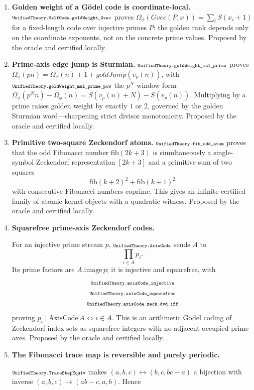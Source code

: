 \documentclass[11pt]{article}
\newcommand{\lean}[1]{\relax\ifmmode\hbox{\scriptsize\ttfamily\detokenize{#1}}\else{\small\texttt{\detokenize{#1}}}\fi}
\begin{document}
\begin{enumerate}[label=(O\arabic*)]
  \item \textbf{Golden weight of a G\"odel code is coordinate-local.}  $\lean{UnifiedTheory.SelfCode.goldWeight_Gvec}$ proves $\Omega_\phi(Gvec(P,x))=\sum_i S(x_i+1)$ for a fixed-length code over injective primes $P$: the golden rank depends only on the coordinate exponents, not on the concrete prime values.  Proposed by the oracle and certified locally.
  \item \textbf{Prime-axis edge jump is Sturmian.}  $\lean{UnifiedTheory.goldWeight_mul_prime}$ proves $\Omega_\phi(pn)=\Omega_\phi(n)+1+goldJump(v_p(n))$, with $\lean{UnifiedTheory.goldWeight_mul_prime_pow}$ the $p^N$ window form $\Omega_\phi(p^Nn)-\Omega_\phi(n)=S(v_p(n)+N)-S(v_p(n))$.  Multiplying by a prime raises golden weight by exactly $1$ or $2$, governed by the golden Sturmian word---sharpening strict divisor monotonicity.  Proposed by the oracle and certified locally.
  \item \textbf{Primitive two-square Zeckendorf atoms.}  $\lean{UnifiedTheory.fib_odd_atom}$ proves that the odd Fibonacci number $\mathrm{fib}(2k{+}3)$ is simultaneously a single-symbol Zeckendorf representation $[2k{+}3]$ and a primitive sum of two squares
  $$
    \mathrm{fib}(k{+}2)^2+\mathrm{fib}(k{+}1)^2
  $$
  with consecutive Fibonacci numbers coprime.  This gives an infinite certified family of atomic kernel objects with a quadratic witness.  Proposed by the oracle and certified locally.
  \item \textbf{Squarefree prime-axis Zeckendorf codes.}\par
  For an injective prime stream $p$, $\lean{UnifiedTheory.AxisCode}$ sends $A$ to
  $$
    \prod_{i\in A}p_i.
  $$
  Its prime factors are $A.\mathrm{image}\,p$; it is injective and squarefree, with
  $$
    \begin{gathered}
    \lean{UnifiedTheory.axisCode_injective}\\
    \lean{UnifiedTheory.axisCode_squarefree}\\
    \lean{UnifiedTheory.axisCode_zeck_dvd_iff}
    \end{gathered}
  $$
  proving $p_i\mid \mathrm{AxisCode}\,A\iff i\in A$.  This is an arithmetic G\"odel coding of Zeckendorf index sets as squarefree integers with no adjacent occupied prime axes.  Proposed by the oracle and certified locally.
  \item \textbf{The Fibonacci trace map is reversible and purely periodic.}\par
  $\lean{UnifiedTheory.TraceStepEquiv}$ makes $(a,b,c)\mapsto(b,c,bc-a)$ a bijection with inverse $(a,b,c)\mapsto(ab-c,a,b)$.  Hence

\end{enumerate}
\end{document}
